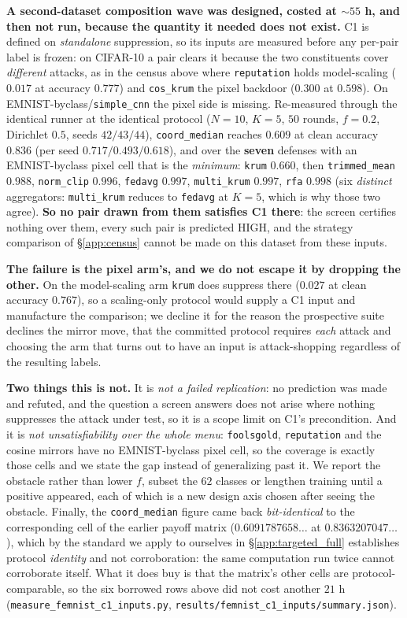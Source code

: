 \documentclass{article}
\begin{document}
\textbf{A second-dataset composition wave was designed, costed at ${\sim}55$ h, and then not run, because the quantity it needed does not exist.} C1 is defined on \emph{standalone} suppression, so its inputs are measured before any per-pair label is frozen: on CIFAR-10 a pair clears it because the two constituents cover \emph{different} attacks, as in the census above where \texttt{reputation} holds model-scaling ($0.017$ at accuracy $0.777$) and \texttt{cos\_krum} the pixel backdoor ($0.300$ at $0.598$). On EMNIST-byclass/\texttt{simple\_cnn} the pixel side is missing. Re-measured through the identical runner at the identical protocol ($N{=}10$, $K{=}5$, $50$ rounds, $f{=}0.2$, Dirichlet $0.5$, seeds $42/43/44$), \texttt{coord\_median} reaches $\mathbf{0.609}$ at clean accuracy $0.836$ (per seed $0.717/0.493/0.618$), and over the \textbf{seven} defenses with an EMNIST-byclass pixel cell that is the \emph{minimum}: \texttt{krum} $0.660$, then \texttt{trimmed\_mean} $0.988$, \texttt{norm\_clip} $0.996$, \texttt{fedavg} $0.997$, \texttt{multi\_krum} $0.997$, \texttt{rfa} $0.998$ (six \emph{distinct} aggregators: \texttt{multi\_krum} reduces to \texttt{fedavg} at $K{=}5$, which is why those two agree). \textbf{So no pair drawn from them satisfies C1 there}: the screen certifies nothing over them, every such pair is predicted HIGH, and the strategy comparison of \S\ref{app:census} cannot be made on this dataset from these inputs.

\noindent \textbf{The failure is the pixel arm's, and we do not escape it by dropping the other.} On the model-scaling arm \texttt{krum} does suppress there ($0.027$ at clean accuracy $0.767$), so a scaling-only protocol would supply a C1 input and manufacture the comparison; we decline it for the reason the prospective suite declines the mirror move, that the committed protocol requires \emph{each} attack and choosing the arm that turns out to have an input is attack-shopping regardless of the resulting labels.

\noindent \textbf{Two things this is not.} It is \emph{not a failed replication}: no prediction was made and refuted, and the question a screen answers does not arise where nothing suppresses the attack under test, so it is a scope limit on C1's precondition. And it is \emph{not unsatisfiability over the whole menu}: \texttt{foolsgold}, \texttt{reputation} and the cosine mirrors have no EMNIST-byclass pixel cell, so the coverage is exactly those cells and we state the gap instead of generalizing past it. We report the obstacle rather than lower $f$, subset the $62$ classes or lengthen training until a positive appeared, each of which is a new design axis chosen after seeing the obstacle. Finally, the \texttt{coord\_median} figure came back \emph{bit-identical} to the corresponding cell of the earlier payoff matrix ($0.6091787658\ldots$ at $0.8363207047\ldots$), which by the standard we apply to ourselves in \S\ref{app:targeted_full} establishes protocol \emph{identity} and not corroboration: the same computation run twice cannot corroborate itself. What it does buy is that the matrix's other cells are protocol-comparable, so the six borrowed rows above did not cost another $21$ h (\texttt{measure\_femnist\_c1\_inputs.py}, \texttt{results/femnist\_c1\_inputs/\allowbreak summary.json}).
\end{document}

